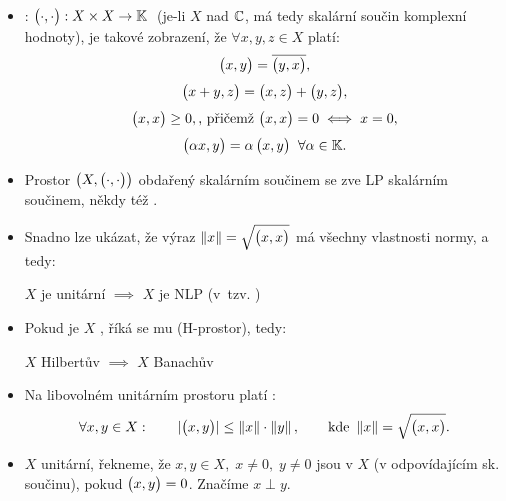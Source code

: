 \begin{itemize}
    \item {}: \hspace{1em} $\big( \cdot, \cdot \big): X \times X \to \mathbb{K} \;$ (je-li $X$ nad $\mathbb{C}$, má tedy skalární součin komplexní hodnoty), je takové zobrazení, že $\forall x, y, z \in X$ platí:
    \begin{gather*}
        \big( x, y \big) = \overline{\big( y, x \big)},
        \\[3pt]
        \big( x+y, z \big) = \big( x, z \big) + \big( y, z \big),
        \\[3pt]
        \big( x, x \big) \geq 0,
        \text{, přičemž }
        \big( x, x \big) = 0
        \iff x = 0,
        \\[3pt]
        \big( \alpha x, y \big) =
        \alpha \, \big( x, y \big)
        \;\; \forall \alpha \in \mathbb{K}.
    \end{gather*}
    
    \item Prostor $\big(X, \big( \cdot, \cdot \big)\big)$ obdařený skalárním součinem se zve LP skalárním součinem, někdy též .
    
    \item Snadno lze ukázat, že výraz $\left\lVert x\right\rVert = \sqrt{\big( x, x \big)}$ má všechny vlastnosti normy, a tedy:
    
    $X$ je unitární $\implies$ $X$ je NLP (v~tzv. )
    
    \item Pokud je $X$ , říká se mu  (H-prostor), tedy:
    
    $X$ Hilbertův $\implies$ $X$ Banachův
    
    \item Na libovolném unitárním prostoru platí :
    $$
        \forall x,y \in X:
        \hspace{2em}
        |\big( x, y \big)| \leq \left\lVert x\right\rVert \cdot \left\lVert y\right\rVert,
        \hspace{2em}
        \text{kde }
        \left\lVert x\right\rVert = \sqrt{\big( x, x \big)}.
    $$
    
    \item $X$ unitární, řekneme, že $x,y \in X, \; x \neq 0, \; y \neq 0$ jsou  v $X$ (v odpovídajícím sk. součinu), pokud $\big( x, y \big) = 0$. Značíme $x \perp y$.
\end{itemize}


